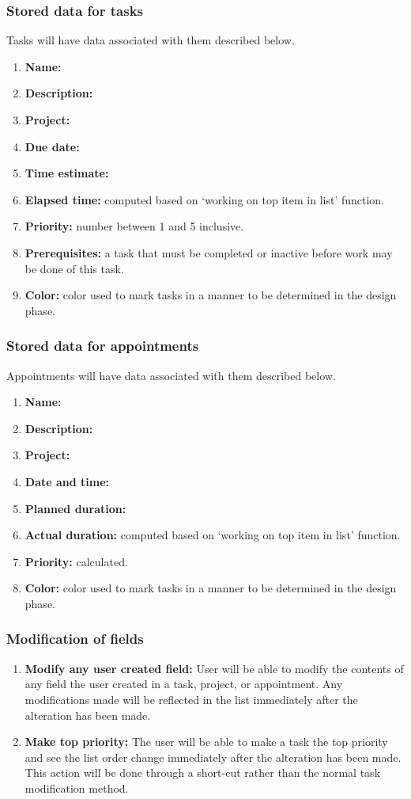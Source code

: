 \documentclass[12pt,a4paper]{article}
\begin{document}
\subsubsection{Stored data for tasks}
Tasks will have data associated with them described below.
\begin{enumerate}
\item \textbf{Name:}
\item \textbf{Description:}
\item \textbf{Project:}
\item \textbf{Due date:}
\item \textbf{Time estimate:}
\item \textbf{Elapsed time:} computed based on `working on top item in list' function.
\item \textbf{Priority:} number between 1 and 5 inclusive.
\item \textbf{Prerequisites:} a task that must be completed or inactive before work may be done of this task.
\item \textbf{Color:} color used to mark tasks in a manner to be determined in the design phase.
\end{enumerate}

\subsubsection{Stored data for appointments}
Appointments will have data associated with them described below.
\begin{enumerate}
\item \textbf{Name:}
\item \textbf{Description:}
\item \textbf{Project:}
\item \textbf{Date and time:}
\item \textbf{Planned duration:}
\item \textbf{Actual duration:} computed based on `working on top item in list' function.
\item \textbf{Priority:} calculated.
\item \textbf{Color:} color used to mark tasks in a manner to be determined in the design phase.
\end{enumerate}

\subsubsection{Modification of fields}
\begin{enumerate}
\item \textbf{Modify any user created field:} User will be able to modify the contents of any field the user created in a task, project, or appointment.  Any modifications made will be reflected in the list immediately after the alteration has been made.
\item \textbf{Make top priority:} The user will be able to make a task the top priority and see the list order change immediately after the alteration has been made.  This action will be done through a short-cut rather than the normal task modification method.
\end{enumerate}
\end{document}
